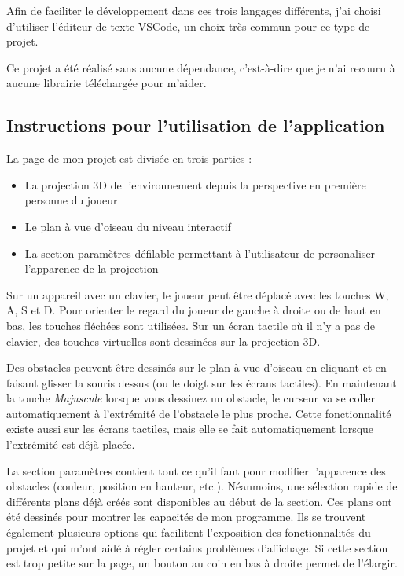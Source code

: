 \documentclass[11pt,french,a4paper,]{article}
\providecommand{\tightlist}{%
  \setlength{\itemsep}{0pt}\setlength{\parskip}{0pt}}
\begin{document}
Afin de faciliter le développement dans ces trois langages différents,
j'ai choisi d'utiliser l'éditeur de texte VSCode, un choix très commun
pour ce type de projet.

Ce projet a été réalisé sans aucune dépendance, c'est-à-dire que je n'ai
recouru à aucune librairie téléchargée pour m'aider.

\hypertarget{instructions-pour-lutilisation-de-lapplication}{%
\subsection{Instructions pour l'utilisation de
l'application}\label{instructions-pour-lutilisation-de-lapplication}}

La page de mon projet est divisée en trois parties :

\begin{itemize}
\tightlist
\item
  La projection 3D de l'environnement depuis la perspective en première
  personne du joueur
\item
  Le plan à vue d'oiseau du niveau interactif
\item
  La section paramètres défilable permettant à l'utilisateur de
  personaliser l'apparence de la projection
\end{itemize}

Sur un appareil avec un clavier, le joueur peut être déplacé avec les
touches W, A, S et D. Pour orienter le regard du joueur de gauche à
droite ou de haut en bas, les touches fléchées sont utilisées. Sur un
écran tactile où il n'y a pas de clavier, des touches virtuelles sont
dessinées sur la projection 3D.

Des obstacles peuvent être dessinés sur le plan à vue d'oiseau en
cliquant et en faisant glisser la souris dessus (ou le doigt sur les
écrans tactiles). En maintenant la touche \emph{Majuscule} lorsque vous
dessinez un obstacle, le curseur va se coller automatiquement à
l'extrémité de l'obstacle le plus proche. Cette fonctionnalité existe
aussi sur les écrans tactiles, mais elle se fait automatiquement lorsque
l'extrémité est déjà placée.

La section paramètres contient tout ce qu'il faut pour modifier
l'apparence des obstacles (couleur, position en hauteur, etc.).
Néanmoins, une sélection rapide de différents plans déjà créés sont
disponibles au début de la section. Ces plans ont été dessinés pour
montrer les capacités de mon programme. Ils se trouvent également
plusieurs options qui facilitent l'exposition des fonctionnalités du
projet et qui m'ont aidé à régler certains problèmes d'affichage. Si
cette section est trop petite sur la page, un bouton au coin en bas à
droite permet de l'élargir.
\end{document}
